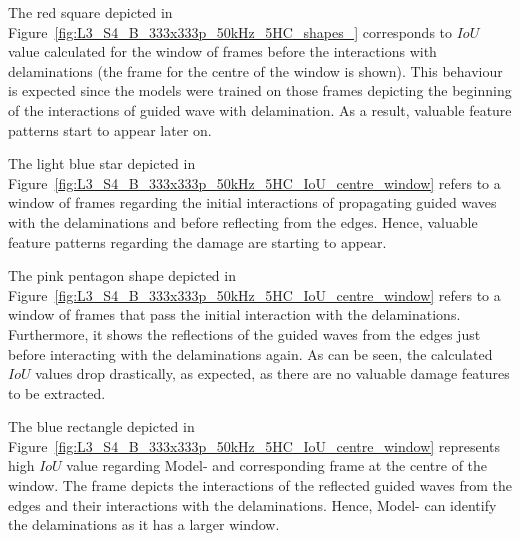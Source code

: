 The red square depicted in Figure~\ref{fig:L3_S4_B_333x333p_50kHz_5HC_shapes_} 
corresponds to \(IoU\) value calculated for the window of frames before the 
interactions with delaminations (the frame for the centre of the window is 
shown).
This behaviour is expected since the models were trained on those frames depicting the beginning of the interactions of guided wave with delamination. 
As a result, valuable feature patterns start to appear later on.

The light blue star depicted in 
Figure~\ref{fig:L3_S4_B_333x333p_50kHz_5HC_IoU_centre_window} refers to a 
window of frames regarding the initial interactions of propagating guided waves 
with the delaminations and before reflecting from the edges.
Hence, valuable feature patterns regarding the damage are starting to appear.

The pink pentagon shape depicted in 
Figure~\ref{fig:L3_S4_B_333x333p_50kHz_5HC_IoU_centre_window} refers to a 
window of frames that pass the initial interaction with the delaminations. 
Furthermore, it shows the reflections of the guided waves from the edges just before interacting with the delaminations again.
As can be seen, the calculated \(IoU\) values drop drastically, as expected, as there are no valuable damage features to be extracted.  

The blue rectangle depicted in 
Figure~\ref{fig:L3_S4_B_333x333p_50kHz_5HC_IoU_centre_window} represents high 
\(IoU\) value regarding Model- and corresponding frame at the centre of 
the window.
The frame depicts the interactions of the reflected guided waves from the edges and their interactions with the delaminations. 
Hence, Model- can identify the delaminations as it has a larger window.

